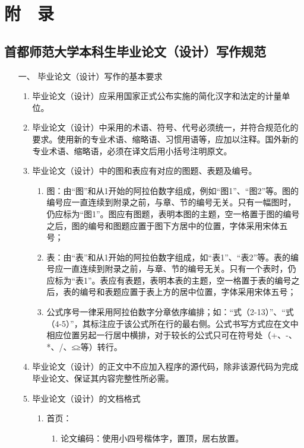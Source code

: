 ﻿\chapter{附$\quad$录}
\label{chap:appendix}
\section{首都师范大学本科生毕业论文（设计）写作规范}
\begin{itemize}[font=\cusong]
\item[一、] {\cusong 毕业论文（设计）写作的基本要求}
\begin{enumerate}
\item 毕业论文（设计）应采用国家正式公布实施的简化汉字和法定的计量单位。
\item 毕业论文（设计）中采用的术语、符号、代号必须统一，并符合规范化的要求。使用新的专业术语、缩略语、习惯用语等，应加以注释。国外新的专业术语、缩略语，必须在译文后用小括号注明原文。
\item 毕业论文（设计）中的图和表应有对应的图题、表题及编号。
	\begin{enumerate}[label=(\arabic* )]
		\item 
图：由“图”和从1开始的阿拉伯数字组成，例如“图1”、“图2”等。图的编号应一直连续到附录之前，与章、节的编号无关。只有一幅图时，仍应标为“图1”。图应有图题，表明本图的主题，空一格置于图的编号之后，图的编号和图题应置于图下方居中的位置，字体采用宋体五号；
		\item 
表：由“表”和从1开始的阿拉伯数字组成，如“表1”、“表2”等。表的编号应一直连续到附录之前，与章、节的编号无关。只有一个表时，仍应标为“表1”。表应有表题，表明本表的主题，空一格置于表的编号之后，表的编号和表题应置于表上方的居中位置，字体采用宋体五号；
		\item 
公式序号一律采用阿拉伯数字分章依序编排；如：“式（2-13）”、“式（4-5）”，其标注应于该公式所在行的最右侧。公式书写方式应在文中相应位置另起一行居中横排，对于较长的公式只可在符号处（+、-、*、/、≤≥等）转行。
	\end{enumerate}
\item 毕业论文（设计）的正文中不应加入程序的源代码，除非该源代码为完成毕业论文、保证其内容完整性所必需。
\item  毕业论文（设计）的文档格式
	\begin{enumerate}[label=(\arabic* )]%
\CTEXindent
		\item 首页：
		\begin{enumerate}[label=\Roman* .]%
\item 论文编码：使用小四号楷体字，置顶，居右放置。

\end{enumerate}
\end{enumerate}
\end{enumerate}
\end{itemize}
